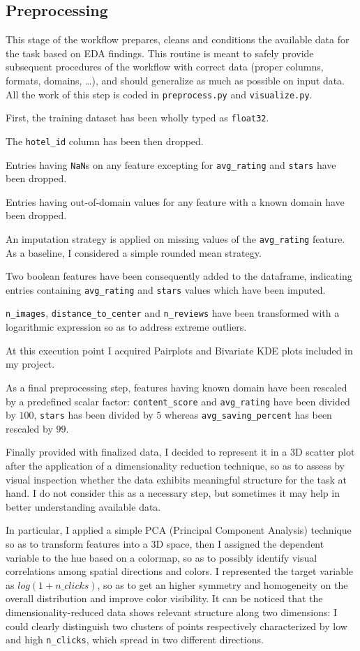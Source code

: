 \documentclass[preprint,12pt,3p]{elsarticle}
\begin{document}
\subsection{Preprocessing}
This stage of the workflow prepares, cleans and conditions the available data for the task based on EDA findings. This routine is meant to safely provide subsequent procedures of the workflow with correct data (proper columns, formats, domains, \ldots), and should generalize as much as possible on input data. All the work of this step is coded in \verb|preprocess.py| and \verb|visualize.py|.

First, the training dataset has been wholly typed as \verb|float32|.

The \verb|hotel_id| column has been then dropped.

Entries having \verb|NaN|s on any feature excepting for \verb|avg_rating| and \verb|stars| have been dropped.

Entries having out-of-domain values for any feature with a known domain have been dropped.

An imputation strategy is applied on missing values of the \verb|avg_rating| feature. As a baseline, I considered a simple rounded mean strategy.

Two boolean features have been consequently added to the dataframe, indicating entries containing \verb|avg_rating| and \verb|stars| values which have been imputed.

\verb|n_images|, \verb|distance_to_center| and \verb|n_reviews| have been transformed with a logarithmic expression so as to address extreme outliers.

At this execution point I acquired Pairplots and Bivariate KDE plots included in my project.

As a final preprocessing step, features having known domain have been rescaled by a predefined scalar factor: \verb|content_score| and \verb|avg_rating| have been divided by $100$, \verb|stars| has been divided by $5$ whereas \verb|avg_saving_percent| has been rescaled by $99$.

Finally provided with finalized data, I decided to represent it in a 3D scatter plot after the application of a dimensionality reduction technique, so as to assess by visual inspection whether the data exhibits meaningful structure for the task at hand. I do not consider this as a necessary step, but sometimes it may help in better understanding available data.

In particular, I applied a simple PCA (Principal Component Analysis) technique so as to transform features into a 3D space, then I assigned the dependent variable to the hue based on a colormap, so as to possibly identify visual correlations among spatial directions and colors. I represented the target variable as $log(1+n\_clicks)$, so as to get an higher symmetry and homogeneity on the overall distribution and improve color visibility. It can be noticed that the dimensionality-reduced data shows relevant structure along two dimensions: I could clearly distinguish two clusters of points respectively characterized by low and high \verb|n_clicks|, which spread in two different directions.
\end{document}
